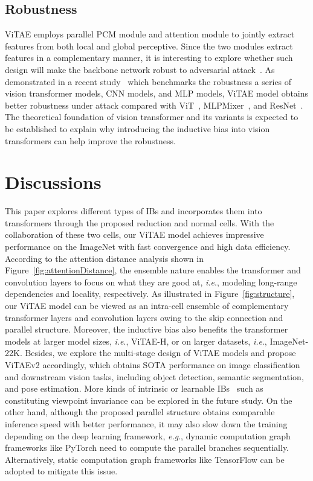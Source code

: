 \documentclass[twocolumn]{svjour3}          \smartqed  \usepackage{natbib}
\newcommand{\ie}{i.e}
\newcommand{\eg}{e.g}
\def\onedot{.\xspace}
\def\eg{\emph{e.g}\onedot}
\def\ie{\emph{i.e}\onedot}
\begin{document}
\subsection{Robustness} 
ViTAE employs parallel PCM module and attention module to jointly extract features from both local and global perceptive. Since the two modules extract features in a complementary manner, it is interesting to explore whether such design will make the backbone network robust to adversarial attack~\citep{bhojanapalli2021understanding}. As demonstrated in a recent study~\citep{tang2021robustart} which benchmarks the robustness a series of vision transformer models, CNN models, and MLP models, ViTAE model obtains better robustness under  attack compared with ViT~\citep{dosovitskiy2020image}, MLPMixer~\citep{tolstikhin2021mlp}, and ResNet~\citep{he2016deep}. The theoretical foundation of vision transformer and its variants is expected to be established to explain why introducing the inductive bias into vision transformers can help improve the robustness. 
\section{Discussions}
\label{sec:ViTAElimit}
This paper explores different types of IBs and incorporates them into transformers through the proposed reduction and normal cells. With the collaboration of these two cells, our ViTAE model achieves impressive performance on the ImageNet with fast convergence and high data efficiency. According to the attention distance analysis shown in Figure~\ref{fig:attentionDistance}, the ensemble nature enables the transformer and convolution layers to focus on what they are good at, \ie, modeling long-range dependencies and locality, respectively. As illustrated in Figure~\ref{fig:structure}, our ViTAE model can be viewed as an intra-cell ensemble of complementary transformer layers and convolution layers owing to the skip connection and parallel structure. Moreover, the inductive bias also benefits the transformer models at larger model sizes, \ie, ViTAE-H, or on larger datasets, \ie, ImageNet-22K. Besides, we explore the multi-stage design of ViTAE models and propose ViTAEv2 accordingly, which obtains SOTA performance on image classification and downstream vision tasks, including object detection, semantic segmentation, and pose estimation. More kinds of intrinsic or learnable IBs~\citep{sabour2017dynamic,zhang2022vsa} such as constituting viewpoint invariance can be explored in the future study. On the other hand, although the proposed parallel structure obtains comparable inference speed with better performance, it may also slow down the training depending on the deep learning framework, \eg, dynamic computation graph frameworks like PyTorch need to compute the parallel branches sequentially. Alternatively, static computation graph frameworks like TensorFlow can be adopted to mitigate this issue.
\end{document}
